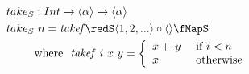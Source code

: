 \documentclass[preview]{standalone}
\begin{document}
\begin{align*}
  take_S &: Int \rightarrow \vect{\alpha} \rightarrow \vect{\alpha} \\
  take_S &\ n = \mathit{takef} \redS \vect{1,2,...} \circ \vect{} \fMapS\\
         & \text{where}\ \ \mathit{takef}\ i\ x\ y = 
           \left\{\begin{array}{ll}
                    x \fcat y & \text{ if } i < n\\
                    x & \text{ otherwise}
                  \end{array}
           \right.\\
\end{align*}
\end{document}
